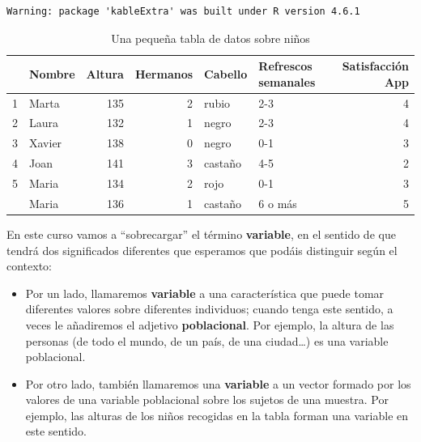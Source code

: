 \documentclass[
  spanish,
  letterpaper,
  DIV=11,
  numbers=noendperiod]{scrreprt}
\begin{document}
\begin{verbatim}
Warning: package 'kableExtra' was built under R version 4.6.1
\end{verbatim}

\begin{longtable}[t]{llrrllr}
\caption{\label{tab:tabla1}Una pequeña tabla de datos sobre niños}\\
\toprule
 & Nombre & Altura & Hermanos & Cabello & Refrescos semanales & Satisfacción App\\
\midrule
1 & Marta & 135 & 2 & rubio & 2-3 & 4\\
2 & Laura & 132 & 1 & negro & 2-3 & 4\\
3 & Xavier & 138 & 0 & negro & 0-1 & 3\\
4 & Joan & 141 & 3 & castaño & 4-5 & 2\\
5 & Maria & 134 & 2 & rojo & 0-1 & 3\\
\addlinespace
6 & Maria & 136 & 1 & castaño & 6 o más & 5\\
\bottomrule
\end{longtable}

\begin{tcolorbox}[enhanced jigsaw, arc=.35mm, bottomrule=.15mm, bottomtitle=1mm, breakable, colback=white, colbacktitle=quarto-callout-caution-color!10!white, colframe=quarto-callout-caution-color-frame, coltitle=black, left=2mm, leftrule=.75mm, opacityback=0, opacitybacktitle=0.6, rightrule=.15mm, title=\textcolor{quarto-callout-caution-color}{\faFire}\hspace{0.5em}{Precaución}, titlerule=0mm, toprule=.15mm, toptitle=1mm]

En este curso vamos a ``sobrecargar'' el término \textbf{variable}, en
el sentido de que tendrá dos significados diferentes que esperamos que
podáis distinguir según el contexto:

\begin{itemize}
\item
  Por un lado, llamaremos \textbf{variable} a una característica que
  puede tomar diferentes valores sobre diferentes individuos; cuando
  tenga este sentido, a veces le añadiremos el adjetivo
  \textbf{poblacional}. Por ejemplo, la altura de las personas (de todo
  el mundo, de un país, de una ciudad\ldots) es una variable
  poblacional.
\item
  Por otro lado, también llamaremos una \textbf{variable} a un vector
  formado por los valores de una variable poblacional sobre los sujetos
  de una muestra. Por ejemplo, las alturas de los niños recogidas en la
  tabla forman una variable en este sentido.
\end{itemize}

\end{tcolorbox}
\end{document}
